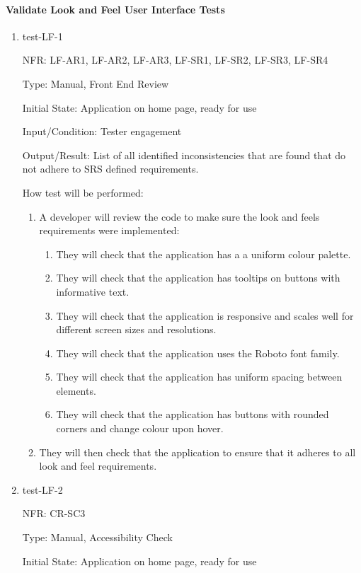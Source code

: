 \documentclass[12pt, titlepage]{article}
\begin{document}
\paragraph{Validate Look and Feel User Interface Tests}
\begin{enumerate}

\item{test-LF-1}

NFR: LF-AR1, LF-AR2, LF-AR3, LF-SR1, LF-SR2, LF-SR3, LF-SR4

Type: Manual, Front End Review
					
Initial State: Application on home page, ready for use
					
Input/Condition: Tester engagement
					
Output/Result: List of all identified inconsistencies that are found that do not adhere to SRS defined requirements.
					
How test will be performed: 
\begin{enumerate}
  \item A developer will review the code to make sure the look and feels requirements were implemented:
  \begin{enumerate}
    \item They will check that the application has a a uniform colour palette.
    \item They will check that the application has tooltips on buttons with informative text.
    \item They will check that the application is responsive and scales well for different screen sizes and resolutions.
    \item They will check that the application uses the Roboto font family.
    \item They will check that the application has uniform spacing between elements.
    \item They will check that the application has buttons with rounded corners and change colour upon hover.
  \end{enumerate}
  \item They will then check that the application to ensure that it adheres to all look and feel requirements.
\end{enumerate}

\item{test-LF-2}

NFR: CR-SC3

Type: Manual, Accessibility Check
					
Initial State: Application on home page, ready for use
					

\end{enumerate}
\end{document}
